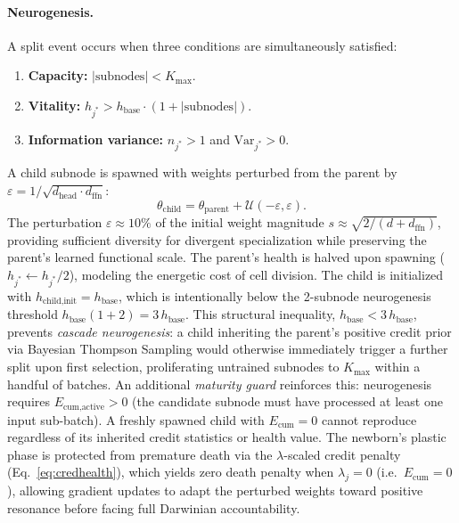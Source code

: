 \documentclass[11pt,a4paper]{article}
\theoremstyle{definition}
\begin{document}
\paragraph{Neurogenesis.}
A split event occurs when three conditions are simultaneously satisfied:
\begin{enumerate}[itemsep=0pt]
  \item \textbf{Capacity:} $|\text{subnodes}| < K_\text{max}$.
  \item \textbf{Vitality:} $h_{j^*} > h_\text{base} \cdot (1 + |\text{subnodes}|)$.
  \item \textbf{Information variance:} $n_{j^*} > 1$ and $\mathrm{Var}_{j^*} > 0$.
\end{enumerate}
A child subnode is spawned with weights perturbed from the parent by
$\varepsilon = 1/\sqrt{d_\text{head} \cdot d_\text{ffn}}$:
\begin{equation}
  \theta_\text{child} = \theta_\text{parent} + \mathcal{U}(-\varepsilon, \varepsilon).
  \label{eq:perturb}
\end{equation}
The perturbation $\varepsilon \approx 10\%$ of the initial weight magnitude
$s \approx \sqrt{2/(d+d_\text{ffn})}$, providing sufficient diversity for divergent
specialization while preserving the parent's learned functional scale.
The parent's health is halved upon spawning ($h_{j^*} \leftarrow h_{j^*}/2$),
modeling the energetic cost of cell division.
The child is initialized with $h_\text{child,init} = h_\text{base}$, which is
intentionally below the 2-subnode neurogenesis threshold $h_\text{base}(1 + 2) = 3\,h_\text{base}$.
This structural inequality, $h_\text{base} < 3\,h_\text{base}$, prevents \emph{cascade neurogenesis}:
a child inheriting the parent's positive credit prior via Bayesian Thompson Sampling
would otherwise immediately trigger a further split upon first selection, proliferating untrained
subnodes to $K_\text{max}$ within a handful of batches.
An additional \emph{maturity guard} reinforces this:
neurogenesis requires $E_\text{cum,active} > 0$ (the candidate subnode must have processed
at least one input sub-batch). A freshly spawned child with $E_\text{cum} = 0$ cannot reproduce
regardless of its inherited credit statistics or health value.
The newborn's plastic phase is protected from premature death via the $\lambda$-scaled credit
penalty (Eq.~\ref{eq:credhealth}), which yields zero death penalty when $\lambda_{j} = 0$
(i.e.\ $E_\text{cum} = 0$), allowing gradient updates to adapt the perturbed weights toward
positive resonance before facing full Darwinian accountability.
\end{document}
